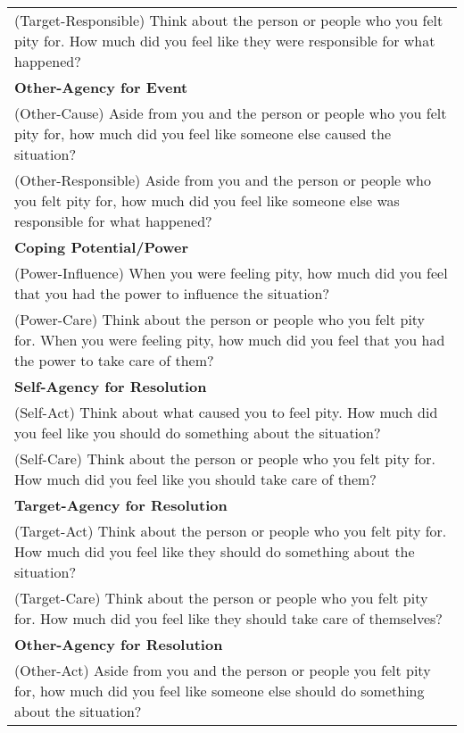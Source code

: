 \documentclass[man]{apa6}
\begin{document}
\begin{longtable}{p{16cm}}
\hspace{1cm}(Target-Responsible) Think about the person or people who you felt pity for. How much did you feel like they were responsible for what happened? \\
\textbf{Other-Agency for Event} \\
\hspace{1cm}(Other-Cause) Aside from you and the person or people who you felt pity for, how much did you feel like someone else caused the situation? \\
\hspace{1cm}(Other-Responsible) Aside from you and the person or people who you felt pity for, how much did you feel like someone else was responsible for what happened? \\
\textbf{Coping Potential/Power} \\
\hspace{1cm}(Power-Influence) When you were feeling pity, how much did you feel that you had the power to influence the situation? \\
\hspace{1cm}(Power-Care) Think about the person or people who you felt pity for. When you were feeling pity, how much did you feel that you had the power to take care of them? \\
\textbf{Self-Agency for Resolution} \\
\hspace{1cm}(Self-Act) Think about what caused you to feel pity. How much did you feel like you should do something about the situation? \\
\hspace{1cm}(Self-Care) Think about the person or people who you felt pity for. How much did you feel like you should take care of them? \\
\textbf{Target-Agency for Resolution} \\
\hspace{1cm}(Target-Act) Think about the person or people who you felt pity for. How much did you feel like they should do something about the situation? \\
\hspace{1cm}(Target-Care) Think about the person or people who you felt pity for. How much did you feel like they should take care of themselves? \\
\textbf{Other-Agency for Resolution} \\
\hspace{1cm}(Other-Act) Aside from you and the person or people you felt pity for, how much did you feel like someone else should do something about the situation? \\

\end{longtable}
\end{document}
